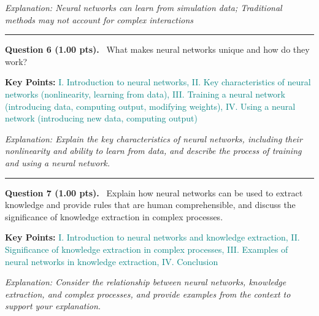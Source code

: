 \documentclass[12pt,a4paper]{article}
\begin{document}
\textit{\small Explanation: Neural networks can learn from simulation data; Traditional methods may not account for complex interactions}



\vspace{0.8em}
\noindent\rule{\linewidth}{0.2pt}
\vspace{0.3em}


\noindent
\textbf{Question 6 (1.00 pts).}~
What makes neural networks unique and how do they work?


\textbf{Key Points:} \textcolor{teal}{I. Introduction to neural networks, II. Key characteristics of neural networks (nonlinearity, learning from data), III. Training a neural network (introducing data, computing output, modifying weights), IV. Using a neural network (introducing new data, computing output)}



\textit{\small Explanation: Explain the key characteristics of neural networks, including their nonlinearity and ability to learn from data, and describe the process of training and using a neural network.}



\vspace{0.8em}
\noindent\rule{\linewidth}{0.2pt}
\vspace{0.3em}


\noindent
\textbf{Question 7 (1.00 pts).}~
Explain how neural networks can be used to extract knowledge and provide rules that are human comprehensible, and discuss the significance of knowledge extraction in complex processes.


\textbf{Key Points:} \textcolor{teal}{I. Introduction to neural networks and knowledge extraction, II. Significance of knowledge extraction in complex processes, III. Examples of neural networks in knowledge extraction, IV. Conclusion}



\textit{\small Explanation: Consider the relationship between neural networks, knowledge extraction, and complex processes, and provide examples from the context to support your explanation.}
\end{document}
